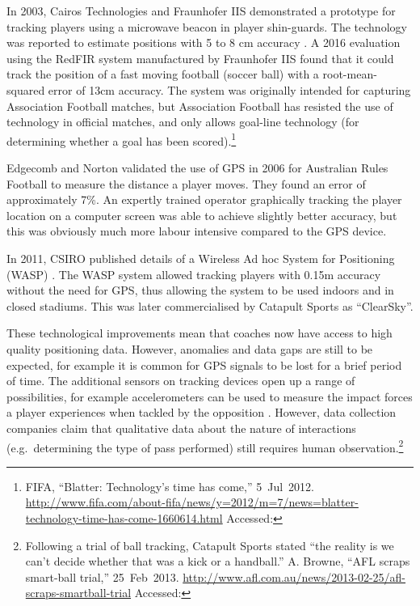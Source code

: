 In 2003, Cairos Technologies and Fraunhofer IIS demonstrated a prototype
for tracking players using a microwave beacon in player shin-guards. The
technology was reported to estimate positions with 5 to 8 cm accuracy
\cite{Beetz2005}. A 2016 evaluation
\cite{Seidl2016} using the RedFIR system
\cite{Grun2011} manufactured by Fraunhofer IIS found that
it could track the position of a fast moving football (soccer ball) with
a root-mean-squared error of 13\thinspace cm accuracy. The system was
originally intended for capturing Association Football matches, but
Association Football has resisted the use of technology in official
matches, and only allows goal-line technology (for determining whether a
goal has been scored).\footnote{FIFA, ``Blatter: Technology's time has
  come,'' 5~Jul~2012.
  \url{http://www.fifa.com/about-fifa/news/y=2012/m=7/news=blatter-technology-time-has-come-1660614.html}
  Accessed: }

Edgecomb and Norton \cite{Edgecomb2006} validated the use
of GPS in 2006 for Australian Rules Football to measure the distance a
player moves. They found an error of approximately 7\%. An expertly
trained operator graphically tracking the player location on a computer
screen was able to achieve slightly better accuracy, but this was
obviously much more labour intensive compared to the GPS device.

In 2011, CSIRO published details of a Wireless Ad hoc System for
Positioning (WASP) \cite{Sathyan2011}. The WASP system allowed
tracking players with 0.15\thinspace m accuracy without the need for
GPS, thus allowing the system to be used indoors and in closed stadiums.
This was later commercialised by Catapult Sports as ``ClearSky''.

These technological improvements mean that coaches now have access to
high quality positioning data. However, anomalies and data gaps are
still to be expected, for example it is common for GPS signals to be
lost for a brief period of time. The additional sensors on tracking
devices open up a range of possibilities, for example accelerometers can
be used to measure the impact forces a player experiences when tackled
by the opposition \cite{Gastin2013, Gastin2014}. However, data collection companies %
claim that
qualitative data about the nature of interactions (e.g.~determining the
type of pass performed) still requires human observation.\footnote{Following a trial of ball tracking, Catapult Sports stated ``the reality is we can't decide whether that was a kick or a handball.'' A.
  Browne, ``AFL scraps smart-ball trial,'' 25~Feb~2013.
  \url{http://www.afl.com.au/news/2013-02-25/afl-scraps-smartball-trial}
  Accessed: }

